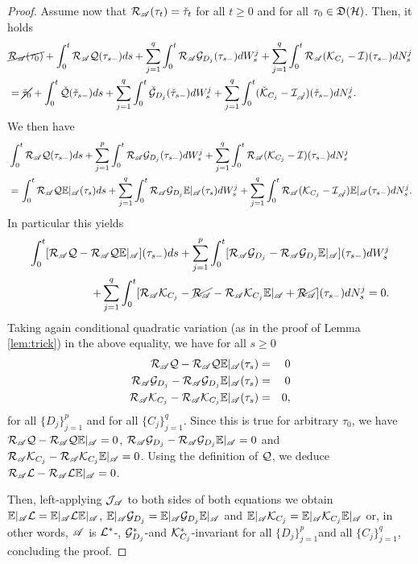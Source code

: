 \documentclass[aihp,12pt]{imsart}
\begin{document}
\begin{proof}
    Assume now that $\Rc_\As(\tau_t) = \check{\tau}_t$ for all $t\geq0$ and for all $\tau_0\in\Df(\Hc)$. Then, it holds 
    \begin{align*}
    &\cancel{\Rc_\As(\tau_0)} + \int_0^t \Rc_\As\Qc(\tau_{s-}) ds + \sum_{j=1}^q \int_0^t \Rc_\As\Gc_{D_j}(\tau_{s-}) dW_s^j+\sum_{j=1}^q \int_{0}^t \Rc_\As(\Kc_{C_j}-\Ic)(\tau_{s-}) dN_s^j \\&= \cancel{\check{\tau}_0} + \int_0^t {\check{\Qc}}(\check{\tau}_{s-}) ds + \sum_{j=1}^q \int_0^t {\check{\Gc}_{D_j}}(\check{\tau}_{s-})dW_s^j +\sum_{j=1}^q \int_{0}^t (\check{\Kc}_{C_j}-\Ic_{\check{\As}})(\check{\tau}_{s-}) dN_s^j.
    \end{align*}
    We then have
     \begin{align*}
         &\int_0^t \Rc_\As\Qc(\tau_{s-}) ds + \sum_{j=1}^p \int_0^t \Rc_\As\Gc_{D_j}(\tau_{s-}) dW_s^j +\sum_{j=1}^q \int_{0}^t \Rc_\As(\Kc_{C_j}-\Ic)(\tau_{s-}) dN_s^j\\ &= \int_0^t \Rc_\As{{\Qc}}\CE_\As({\tau}_s) ds + \sum_{j=1}^q \int_0^t \Rc_\As{{\Gc}_{D_j}}\CE_\As({\tau}_s) dW_s^j +\sum_{j=1}^q \int_{0}^t \Rc_\As(\Kc_{C_j}-\Ic_{\check{\As}})\CE_\As(\tau_{s-}) dN_s^j .
     \end{align*}
    In particular this yields
    \begin{align*}
        \int_0^t [\Rc_\As\Qc -\Rc_\As{{\Qc}}\CE_\As](\tau_{s-}) ds + \sum_{j=1}^p \int_0^t [\Rc_\As\Gc_{D_j}-\Rc_\As{{\Gc}_{D_j}}\CE_\As](\tau_{s-}) dW_s^j \\+ \sum_{j=1}^q \int_{0}^t [\Rc_\As\Kc_{C_j}-\cancel{\Rc_\As} - \Rc_\As\Kc_{C_j}\CE_\As + \cancel{\Rc_\As}](\tau_{s-}) dN_s^j = 0. 
    \end{align*}
    Taking again conditional quadratic variation  (as in the proof of Lemma \ref{lem:trick}) in the above equality, we have for all $s\geq0$
    \begin{eqnarray*}
     \Rc_\As\Qc -\Rc_\As{{\Qc}}\CE_\As(\tau_{s}) &=& 0 \\
     \Rc_\As\Gc_{D_j}-\Rc_\As{{\Gc}_{D_j}}\CE_\As(\tau_{s})&=&0\\
     \Rc_\As\Kc_{C_j} - \Rc_\As\Kc_{C_j}\CE_\As  (\tau_{s})&=&0,
    \end{eqnarray*}
    for all $\{D_j\}_{j=1}^p$ and for all $\{C_j\}_{j=1}^q$. Since this is true for arbitrary $\tau_0$, we have $\Rc_\As\Qc -\Rc_\As{{\Qc}}\CE_\As = 0$, $\Rc_\As\Gc_{D_j}-\Rc_\As{{\Gc}_{D_j}}\CE_\As=0$ and $\Rc_\As\Kc_{C_j} - \Rc_\As\Kc_{C_j}\CE_\As  =0$. Using the definition of $\Qc$, we deduce $\Rc_\As\Lc -\Rc_\As{{\Lc}}\CE_\As = 0$.
 
 Then, left-applying $\Jc_\As$ to both sides of both equations we obtain $\CE_\As\Lc =\CE_\As{{\Lc}}\CE_\As$, $\CE_\As\Gc_{D_j}=\CE_\As{{\Gc}_{D_j}}\CE_\As$ and $\CE_\As\Kc_{C_j} = \CE_\As\Kc_{C_j}\CE_\As$ or, in other words, $\As$ is $\Lc^*$-, $\Gc_{D_j}^*$-and $\Kc_{C_j}^*$-invariant for all $\{D_j\}_{j=1}^p$and all $\{C_j\}_{j=1}^q$, concluding the proof.
\end{proof}
\end{document}
